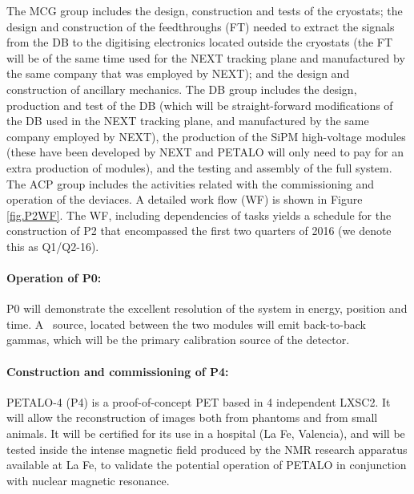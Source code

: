 The MCG group includes the design, construction and tests of the cryostats; the design and construction of the feedthroughs (FT) needed to extract the signals from the DB to the digitising electronics located outside the cryostats (the FT will be of the same time used for the NEXT tracking plane and manufactured by the same company that was employed by NEXT);  and the design and construction of ancillary mechanics. The DB group includes the design, production and test of the DB (which will be straight-forward modifications of the DB used in the NEXT tracking plane, and manufactured by the same company employed by NEXT), the production of the SiPM high-voltage modules (these have been developed by NEXT and PETALO will only need to pay for an extra production of modules), and the testing and assembly of the full system. The ACP group includes the activities related with the commissioning and operation of the deviaces. A detailed work flow (WF) is shown in Figure \ref{fig.P2WF}. The WF, including dependencies of tasks yields a schedule for the construction of P2 that encompassed the first two quarters of 2016 (we denote this as Q1/Q2-16). 

\paragraph{Operation of P0:}


P0 will demonstrate the excellent resolution of the system in energy, position and time. A \NA\ source, located between the two modules will emit back-to-back gammas, which will be the primary calibration source of the detector. 

\paragraph{Construction and commissioning of P4:}
%

PETALO-4 (P4) is a proof-of-concept PET based in 4 independent LXSC2. It will allow the reconstruction of images both from phantoms and from small animals. It will be certified for its use in a hospital (La Fe, Valencia), and will be tested inside the intense magnetic field produced by the NMR research apparatus available at La Fe, to validate the potential operation of PETALO in conjunction with nuclear magnetic resonance.  

